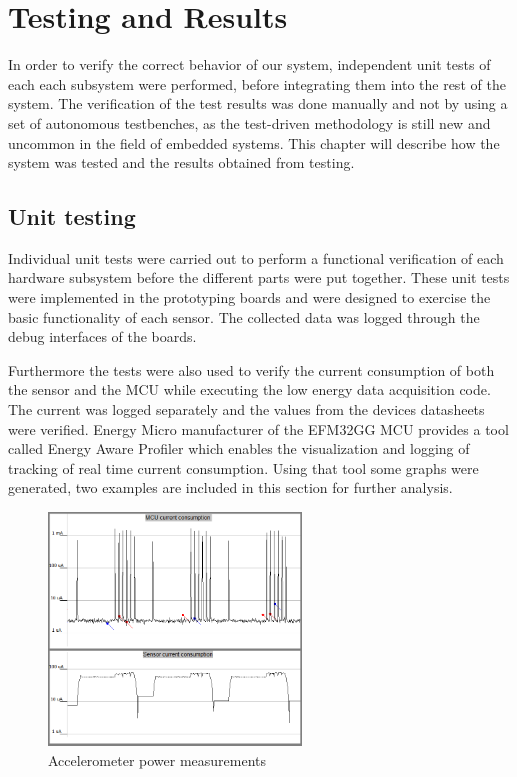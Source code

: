 \chapter{Testing and Results}
In order to verify the correct behavior of our system, independent unit tests of each each subsystem were performed, before integrating them into the rest of the system. The verification of the test results was done manually and not by using a set of autonomous testbenches, as the test-driven methodology is still new and uncommon in the field of embedded systems. This chapter will describe how the system was tested and the results obtained from testing.

\section{Unit testing}
Individual unit tests were carried out to perform a functional verification of each hardware subsystem before the different parts were put together. These unit tests were implemented in the prototyping boards and were designed to exercise the basic functionality of each sensor. The collected data was logged through the debug interfaces of the boards.

Furthermore the tests were also used to verify the current consumption of both the sensor and the MCU while executing the low energy data acquisition code. The current was logged separately and the values from the devices datasheets were verified. Energy Micro manufacturer of the EFM32GG MCU provides a tool called Energy Aware Profiler which enables the visualization and logging of tracking of real time current consumption. Using that tool some graphs were generated, two examples are included in this section for further analysis.

\begin{figure}
\centering
\includegraphics[width=0.6\textwidth]{Images/accel_merged}
\caption{Accelerometer power measurements}
\label{fig:accelerometer}
\end{figure}


